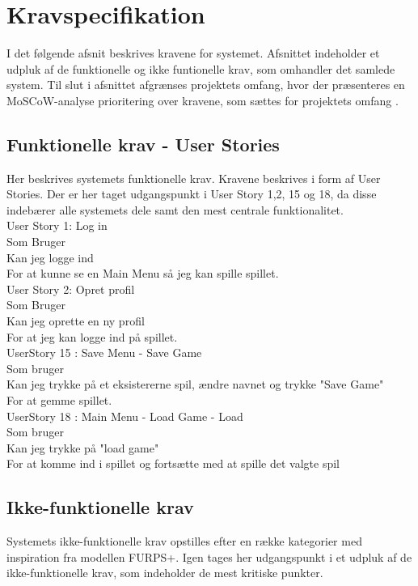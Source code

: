 \section{Kravspecifikation}
\label{sec:kravspec}

I det følgende afsnit beskrives kravene for systemet. Afsnittet indeholder et udpluk af de funktionelle og ikke funtionelle krav, som omhandler det samlede system.
Til slut i afsnittet afgrænses projektets omfang, hvor der præsenteres en MoSCoW-analyse prioritering over kravene, som sættes for projektets omfang \parencite[][Section 5.2]{TekniskBilag}.\\  


\subsection{Funktionelle krav - User Stories}
Her beskrives systemets funktionelle krav. Kravene beskrives i form af User Stories. Der er her taget udgangspunkt i User Story 1,2, 15 og 18, da disse indebærer alle systemets dele samt den mest centrale funktionalitet.\\  
 
User Story 1: Log in \\
  Som Bruger \\
  Kan jeg logge ind \\
  For at kunne se en Main Menu så jeg kan spille spillet. \\
  
User Story 2: Opret profil \\
  Som Bruger \\
  Kan jeg oprette en ny profil \\
  For at jeg kan logge ind på spillet. \\
  
UserStory 15 : Save Menu - Save Game\\
  Som bruger \\
  Kan jeg trykke på et eksistererne spil, ændre navnet og trykke "Save Game" \\
  For at gemme spillet.\\

UserStory 18 : Main Menu - Load Game - Load\\
  Som bruger \\
  Kan jeg trykke på "load game" \\
  For at komme ind i spillet og fortsætte med at spille det valgte spil\\


\subsection{Ikke-funktionelle krav}
Systemets ikke-funktionelle krav opstilles efter en række kategorier med inspiration fra modellen FURPS+. Igen tages her udgangspunkt i et udpluk af de ikke-funktionelle krav, som indeholder de mest kritiske punkter.\\

